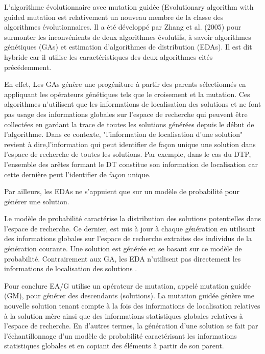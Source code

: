 L’algorithme évolutionnaire avec mutation guidée (Evolutionary algorithm with guided mutation \cite{zhang2005evolutionary} est relativement un nouveau membre de la classe des algorithmes évolutionnaires. Il a été développé par Zhang et al. (2005) \cite{zhang2005evolutionary} pour surmonter les inconvénients de deux algorithmes évolutifs, à savoir algorithmes génétiques (GAs) et estimation d'algorithmes de distribution (EDAs). Il est dit hybride car il utilise les caractéristiques des deux algorithmes cités précédemment. 

En effet, Les GAs génère une progéniture à partir des parents sélectionnés en appliquant les opérateurs génétiques tels que le croisement et la mutation. Ces algorithmes  n’utilisent que les informations de localisation des solutions et ne font pas usage des informations globales sur l’espace de recherche qui peuvent être collectées en gardant la trace de toutes les solutions générées depuis le début de l’algorithme. Dans ce contexte, "l’information de localisation d’une solution" revient à dire,l’information qui peut identifier de façon unique une solution dans l’espace de recherche de toutes les solutions. Par exemple, dans le cas du DTP, l’ensemble des arêtes formant le DT constitue son information de localisation car cette dernière peut l’identifier de façon unique.

Par ailleurs, les EDAs ne s’appuient que sur un modèle de probabilité pour générer une solution.

Le modèle de probabilité caractérise la distribution des solutions potentielles dans l’espace de recherche. Ce dernier, est mis à jour à chaque génération en utilisant des informations globales sur  l’espace de recherche extraites des individus de la génération courante. Une solution est générée en se basant sur ce modèle de probabilité. Contrairement aux GA, les EDA n'utilisent pas directement les informations de localisation des solutions \cite{chaurasia2016hybrid}. 

Pour conclure EA/G utilise un opérateur de mutation, appelé mutation guidée (GM), pour générer des descendants (solutions). La mutation guidée génère une nouvelle solution tenant compte à la fois des informations de localisation relatives à la solution mère ainsi que des informations statistiques globales relatives à l'espace de recherche. En d'autres termes, la génération d’une solution se fait par l’échantillonnage d’un modèle de probabilité caractérisant les informations statistiques globales et en copiant des éléments à partir de son parent.


